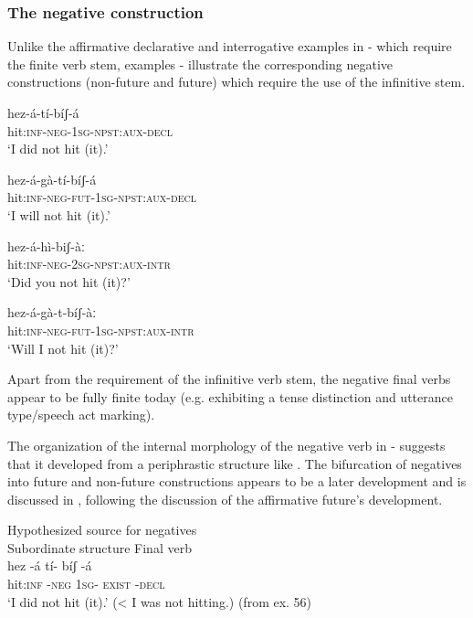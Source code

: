 \documentclass[output=paper]{langsci/langscibook}
\begin{document}
\subsubsection{The negative construction}\label{sec:mahland:3.1.1}

Unlike the affirmative declarative and interrogative examples in - which require the finite verb stem, examples - illustrate the corresponding negative constructions (non-future and future) which require the use of the infinitive stem.

\ea\label{ex:mahland:56}
\gll hez-\'{a}-t\'{i}-b\'{i}ʃ-\'{a}\\
hit:\textsc{inf-neg-1sg-npst:aux-decl} \\
\glt `I did not hit (it).'
\z

\ea\label{ex:mahland:57}
\gll hez-\'{a}-g\`{a}-t\'{i}-b\'{i}ʃ-\'{a}\\
hit:\textsc{inf-neg-fut-1sg-npst:aux-decl} \\
\glt `I will not hit (it).'
\z

\ea\label{ex:mahland:58}
\gll hez-\'{a}-h\`{i}-biʃ-\`{a}ː\\
hit:\textsc{inf-neg-2sg-npst:aux-intr}\\
\glt `Did you not hit (it)?'
\z

\ea\label{ex:mahland:59}
\gll hez-\'{a}-g\`{a}-t-b\'{i}ʃ-\`{a}ː\\
hit:\textsc{inf-neg-fut-1sg-npst:aux-intr}\\
\glt `Will I not hit (it)?'
\z

Apart from the requirement of the infinitive verb stem, the negative final verbs appear to be fully finite today (e.g. exhibiting a tense distinction and utterance type/speech act marking). 

The organization of the internal morphology of the negative verb in - suggests that it developed from a periphrastic structure like . The bifurcation of negatives into future and non-future constructions appears to be a later development and is discussed in , following the discussion of the affirmative future's development.

\ea\label{ex:mahland:60}
Hypothesized source for negatives\\
Subordinate structure        Final verb\\
\gll  hez                {}-\'{a}                 t\'{i}-           b\'{i}ʃ      {}-\'{a}    \\
  hit\textsc{:inf}          \textsc{{}-neg}            \textsc{1sg}{}-            \textsc{exist   {}-decl }\\
  \glt `I did not hit (it).' ({\textless} I was not hitting.)  (from ex. 56)
  \z
 
\end{document}
